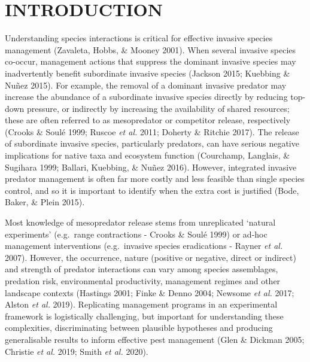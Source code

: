 \documentclass[]{elsarticle} %
\begin{document}
\newpage

\hypertarget{introduction}{%
\section{INTRODUCTION}\label{introduction}}

Understanding species interactions is critical for effective invasive species management (Zavaleta, Hobbs, \& Mooney 2001). When several invasive species co-occur, management actions that suppress the dominant invasive species may inadvertently benefit subordinate invasive species (Jackson 2015; Kuebbing \& Nuñez 2015). For example, the removal of a dominant invasive predator may increase the abundance of a subordinate invasive species directly by reducing top-down pressure, or indirectly by increasing the availability of shared resources; these are often referred to as mesopredator or competitor release, respectively (Crooks \& Soulé 1999; Ruscoe \emph{et al.} 2011; Doherty \& Ritchie 2017). The release of subordinate invasive species, particularly predators, can have serious negative implications for native taxa and ecosystem function (Courchamp, Langlais, \& Sugihara 1999; Ballari, Kuebbing, \& Nuñez 2016). However, integrated invasive predator management is often far more costly and less feasible than single species control, and so it is important to identify when the extra cost is justified (Bode, Baker, \& Plein 2015).

Most knowledge of mesopredator release stems from unreplicated `natural experiments' (e.g.~range contractions - Crooks \& Soulé 1999) or ad-hoc management interventions (e.g.~invasive species eradications - Rayner \emph{et al.} 2007). However, the occurrence, nature (positive or negative, direct or indirect) and strength of predator interactions can vary among species assemblages, predation risk, environmental productivity, management regimes and other landscape contexts (Hastings 2001; Finke \& Denno 2004; Newsome \emph{et al.} 2017; Alston \emph{et al.} 2019). Replicating management programs in an experimental framework is logistically challenging, but important for understanding these complexities, discriminating between plausible hypotheses and producing generalisable results to inform effective pest management (Glen \& Dickman 2005; Christie \emph{et al.} 2019; Smith \emph{et al.} 2020).
\end{document}
